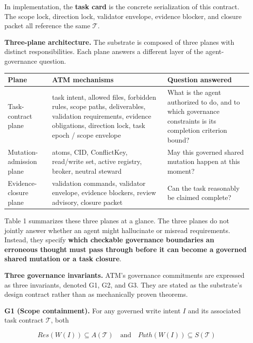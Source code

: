 \documentclass[9pt,letterpaper]{extarticle}
\newcommand{\TableLargeFont}{\fontsize{8.8}{10.0}\selectfont}
\newcommand{\TableLead}[1]{\par\smallskip\noindent{\raggedright\small\bfseries #1\par}\smallskip}
\begin{document}
In implementation, the \textbf{task card} is the concrete serialization of this contract. The scope lock, direction lock, validator envelope, evidence blocker, and closure packet all reference the same $\mathcal{T}$.

\textbf{Three-plane architecture.} The substrate is composed of three planes with distinct responsibilities. Each plane answers a different layer of the agent-governance question.

\TableLead{Table 1 --- Governance-Plane Summary.}

\begingroup
\TableLargeFont
\setlength{\tabcolsep}{3pt}
\begin{longtable}{@{}L{0.22\textwidth}L{0.25\textwidth}L{0.47\textwidth}@{}}
\toprule
Plane & ATM mechanisms & Question answered \\
\midrule
Task-contract plane & task intent, allowed files, forbidden rules, scope paths, deliverables, validation requirements, evidence obligations, direction lock, task epoch / scope envelope & What is the agent authorized to do, and to which governance constraints is its completion criterion bound? \\
Mutation-admission plane & atoms, CID, ConflictKey, read/write set, active registry, broker, neutral steward & May this governed shared mutation happen at this moment? \\
Evidence-closure plane & validation commands, validator envelope, evidence blockers, review advisory, closure packet & Can the task reasonably be claimed complete? \\
\bottomrule
\end{longtable}
\endgroup

Table 1 summarizes these three planes at a glance. The three planes do not jointly answer whether an agent might hallucinate or misread requirements. Instead, they specify \textbf{which checkable governance boundaries an erroneous thought must pass through before it can become a governed shared mutation or a task closure}.

\textbf{Three governance invariants.} ATM's governance commitments are expressed as three invariants, denoted G1, G2, and G3. They are stated as the substrate's design contract rather than as mechanically proven theorems.

\textbf{G1 (Scope containment).} For any governed write intent $I$ and its associated task contract $\mathcal{T}$, both

\[
Res(W(I)) \subseteq A(\mathcal{T})
\quad\text{and}\quad
Path(W(I)) \subseteq S(\mathcal{T})
\]
\end{document}
